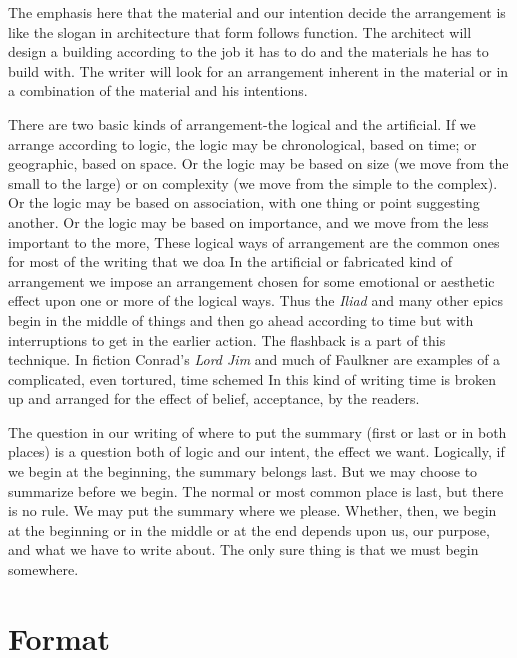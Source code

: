 \documentclass[
    oneside,
    11pt,
    draft
]{memoir}
\begin{document}
The emphasis here that the material and our intention decide the arrangement is like the slogan in architecture that form follows function. The architect will design a building according to the job it has to do and the materials he has to build with. The writer will look for an arrangement inherent in the material or in a combination of the material and his intentions.

There are two basic kinds of arrangement-the logical and the artificial. If we arrange according to logic, the logic may be chronological, based on time; or geographic, based on space. Or the logic may be based on size (we move from the small to the large) or on complexity (we move from the simple to the complex). Or the logic may be based on association, with one thing or point suggesting another. Or the logic may be based on importance, and we move from the less important to the more, These logical ways of arrangement are the common ones for most of the writing that we doa In the artificial or fabricated kind of arrangement we impose an arrangement chosen for some emotional or aesthetic effect upon one or more of the logical ways. Thus the \emph{Iliad} and many other epics begin in the middle of things and then go ahead according to time but with interruptions to get in the earlier action. The flashback is a part of this technique. In fiction Conrad's \emph{Lord Jim} and much of Faulkner are examples of a complicated, even tortured, time schemed In this kind of writing time is broken up and arranged for the effect of belief, acceptance, by the readers.

The question in our writing of where to put the summary (first or last or in both places) is a question both of logic and our intent, the effect we want. Logically, if we begin at the beginning, the summary belongs last. But we may choose to summarize before we begin. The normal or most common place is last, but there is no rule. We may put the summary where we please. Whether, then, we begin at the beginning or in the middle or at the end depends upon us, our purpose, and what we have to write about. The only sure thing is that we must begin somewhere.

\chapter{Format}
\end{document}
